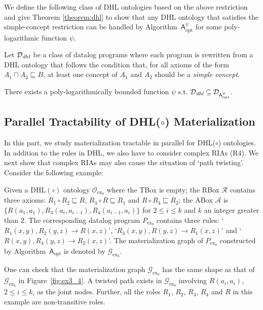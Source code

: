 We define the following class of DHL ontologies based on the above restriction and
give Theorem \ref{theorem:dhl} to show that any DHL ontology that satisfies the
simple-concept restriction can be handled by Algorithm~$\mathsf{A}^\psi_{\text{opt}}$
for some poly-logarithmic function $\psi$.

\begin{definition} Let $\mathcal{D}_{\textit{\text{dhl}}}$ be a class of datalog programs where
each program is rewritten from a DHL ontology that follows the condition that, for all axioms of the form
$A_1\sqcap A_2\sqsubseteq B$, at least one concept of $A_1$ and $A_2$ should be a \emph{simple concept}.
\end{definition}

\begin{theorem}\label{theorem:dhl}
There exists a poly-logarithmically bounded function $\psi$ s.t.
$\mathcal{D}_{\textit{\text{dhl}}}\subseteq\mathcal{D}_{\mathsf{A}_{\text{opt}}^{\psi}}$.
\end{theorem}


\subsection{Parallel Tractability of DHL($\circ$) Materialization}
\label{sec:DHLo}

In this part, we study materialization tractable in parallel for DHL($\circ$) ontologies.
In addition to the rules in DHL, we also have to consider complex RIAs (R4).
We next show that complex RIAs may also cause the situation of `path twisting'.
Consider the following example:
%
\begin{example}\label{exp:complexRIA}
Given a DHL$(\circ)$ ontology $\mathcal{O}_{\text{ex}_9}$ where the TBox is empty;
the RBox $\mathcal{R}$ contains three axioms:
$R_1\circ R_2\sqsubseteq R$, $R_3\circ R\sqsubseteq R_1$ and $R\circ R_4\sqsubseteq R_2$;
the ABox $\mathcal{A}$ is $\{R(a_1,a_1), R_3(a_i,a_{i-1}), R_4(a_{i-1},a_i)\}$
for $2\leq i\leq k$ and $k$ an integer greater than $2$.
The corresponding datalog program $P_{\text{ex}_9}$
contains three rules: `$R_1(x,y),R_2(y,z)\rightarrow R(x,z)$',
`$R_3(x,y),R(y,z)\rightarrow R_1(x,z)$' and `$R(x,y),R_4(y,z)\rightarrow R_2(x,z)$'.
The materialization graph of $P_{\text{ex}_9}$ constructed by Algorithm~$\mathsf{A}_{\text{opt}}$ is denoted by $\mathcal{G}_{\text{ex}_9}$.
\end{example}

One can check that the materialization graph $\mathcal{G}_{\text{ex}_9}$ has the same shape as that
of $\mathcal{G}_{\text{ex}_6}$ in Figure~\ref{fig:ex3_4}.
A twisted path exists in $\mathcal{G}_{\text{ex}_9}$ involving
$R(a_i,a_i)$, $2\leq i\leq k$, as the joint nodes.
Further, all the roles $R_1$, $R_2$, $R_3$, $R_4$ and $R$ in this example are non-transitive roles.

